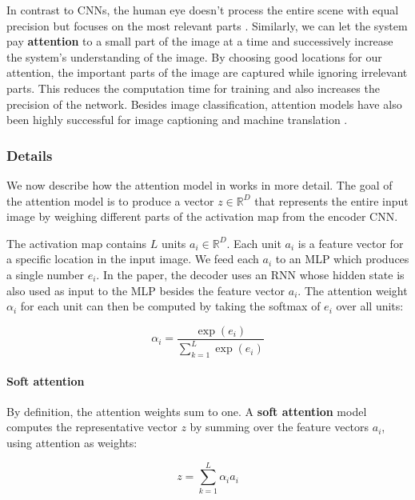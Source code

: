 
In contrast to CNNs, the human eye doesn't process the entire scene with equal precision but focuses on the most relevant parts \cite{DeepMindAttention}.
Similarly, we can let the system pay \textbf{attention} to a small part of the image at a time and successively increase the system's understanding of the image.
By choosing good locations for our attention, the important parts of the image are captured while ignoring irrelevant parts.
This reduces the computation time for training and also increases the precision of the network.
Besides image classification, attention models have also been highly successful for image captioning \cite{AttendAndTell} and machine translation \cite{machine_translation_attention}.

\subsubsection{Details}
We now describe how the attention model in \cite{AttendAndTell} works in more detail.
The goal of the attention model is to produce a vector $z \in \mathbb{R}^D$ that represents the entire input image by weighing different parts of the activation map from the encoder CNN.

The activation map contains $L$ units $a_i \in \mathbb{R}^D$.
Each unit $a_i$ is a feature vector for a specific location in the input image. We feed each $a_i$ to an MLP which produces a single number $e_i$. In the paper, the decoder uses an RNN whose hidden state is also used as input to the MLP besides the feature vector $a_i$.
The attention weight $\alpha_i$ for each unit can then be computed by taking the softmax of $e_i$ over all units:

\[
\alpha_i = \frac{ \exp(e_i) }{ \sum_{k=1}^L \exp(e_i) }
\]

\paragraph{Soft attention}
By definition, the attention weights sum to one. A \textbf{soft attention} model computes the representative vector $z$ by summing over the feature vectors $a_i$, using attention as weights:

\[
z = \sum_{k=1}^L \alpha_i a_i
\]

